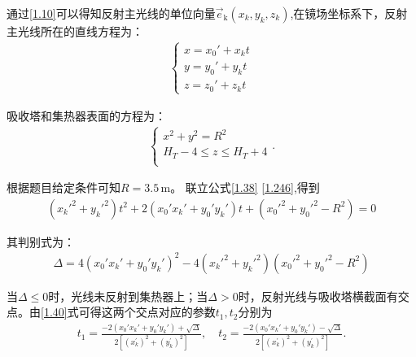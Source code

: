 \documentclass[../main.tex]{subfiles}
\begin{document}
\par 通过\eqref{1.10}可以得知反射主光线的单位向量$\vec{e}_{\text{k}}(x_k,y_k,z_k)$,在镜场坐标系下，反射主光线所在的直线方程为：
\begin{align}\label{1.38}
  \begin{cases}
x = x_0' + x_k t \\
y = y_0' + y_k t \\
z = z_0' + z_k t
\end{cases}
\end{align}
\par 吸收塔和集热器表面的方程为：
\begin{align}\label{1.246}
\begin{cases}
x^2+y^2=R^2\\
H_T-4\leqslant z\leqslant H_T+4\\
\end{cases}.
\end{align}
\par 根据题目给定条件可知\( R = 3.5 \, \text{m} \)。 联立公式\eqref{1.38} \eqref{1.246},得到
\begin{align}    \label{1.40}
(x_{k}'^{2}+y_{k}'^{2})t^{2}+2(x_{0}'x_{k}'+y_{0}'y_{k}')t+(x_{0}'^{2}+y_{0}'^{2}-R^{2}) = 0
\end{align}
\par 其判别式为：
\begin{align}    \label{1.41}
\Delta=4(x_0'x_k' + y_0'y_k')^2 - 4(x_k'^2 + y_k'^2)(x_0'^2 + y_0'^2 - R^2)
\end{align}
\par 当\(\Delta \leqslant 0\)时，光线未反射到集热器上；当\(\Delta > 0\)时，反射光线与吸收塔横截面有交点。由\eqref{1.40}式可得这两个交点对应的参数$t_1,t_2$分别为
\begin{align}
t_1=\frac{-2(x_0'x_k'+y_0'y_k')+\sqrt{\Delta}}{2\left[ \left( x_{k}^{\prime} \right) ^2+\left( y_{k}^{\prime} \right) ^2 \right]},\quad t_2=\frac{-2(x_0'x_k'+y_0'y_k')-\sqrt{\Delta}}{2\left[ \left( x_{k}^{\prime} \right) ^2+\left( y_{k}^{\prime} \right) ^2 \right]}.
\end{align}
\end{document}

